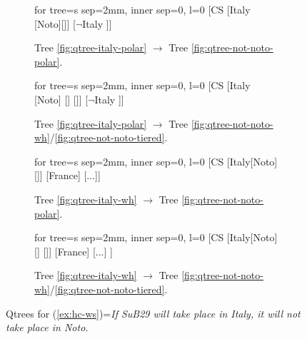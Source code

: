 \begin{figure}[H]
\centering
\begin{subfigure}[b]{.22\linewidth}
	\centering
	\scalebox{.8}
	{\begin{forest}for tree={s sep=2mm, inner sep=0, l=0}
			[CS [{Italy} [Noto][]] [{$\neg$Italy} ]]
	\end{forest}}
	\caption{Tree \ref{fig:qtree-italy-polar} $\rightarrow$ Tree \ref{fig:qtree-not-noto-polar}.}
\end{subfigure}\hfill
\begin{subfigure}[b]{.25\linewidth}
	\centering
	\scalebox{.8}
	{\begin{forest}for tree={s sep=2mm, inner sep=0, l=0}
			[CS [{Italy} [{Noto}] [] []] [{$\neg$Italy} ]]
	\end{forest}}
	\caption{Tree \ref{fig:qtree-italy-polar} $\rightarrow$ Tree \ref{fig:qtree-not-noto-wh}/\ref{fig:qtree-not-noto-tiered}.}\label{ex:qtree-if-italy-not-noto-polar-wh}
\end{subfigure}
\hfill
\begin{subfigure}[b]{.22\linewidth}
	\centering
	\scalebox{.8}
	{\begin{forest}for tree={s sep=2mm, inner sep=0, l=0}
			[CS [Italy[Noto][]] [France] [...]]
	\end{forest}}
	\caption{Tree \ref{fig:qtree-italy-wh} $\rightarrow$ Tree \ref{fig:qtree-not-noto-polar}.}
\end{subfigure}\hfill
\begin{subfigure}[b]{.25\linewidth}
	\centering
	\scalebox{.8}
	{\begin{forest}for tree={s sep=2mm, inner sep=0, l=0}
			[CS [Italy[{Noto}] [] []] [France] [...] ]
	\end{forest}}
	\caption{Tree \ref{fig:qtree-italy-wh} $\rightarrow$ Tree \ref{fig:qtree-not-noto-wh}/\ref{fig:qtree-not-noto-tiered}.}\label{ex:qtree-if-italy-not-noto-wh-wh}
\end{subfigure}
\caption{Qtrees for (\ref{ex:hc-ws})=\textit{If SuB29 will take place in Italy, it will not take place in Noto.}}
\label{fig:qtrees-if-italy-not-noto}
\end{figure}


